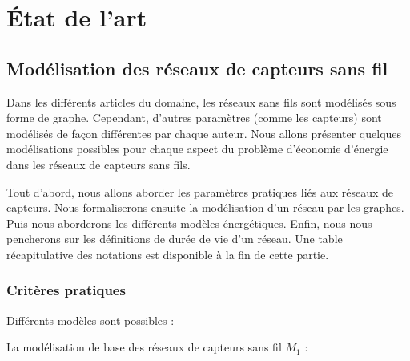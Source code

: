 
\chapter{État de l'art}\label{etat_art}

\section{Modélisation des réseaux de capteurs sans fil}


Dans les différents articles du domaine, les réseaux sans fils sont modélisés sous forme de graphe. Cependant, d'autres paramètres (comme les capteurs) sont modélisés de façon différentes par chaque auteur. Nous allons présenter quelques modélisations possibles pour chaque aspect du problème d'économie d'énergie dans les réseaux de capteurs sans fils.

Tout d'abord, nous allons aborder les paramètres pratiques liés aux réseaux de capteurs. Nous formaliserons ensuite la modélisation d'un réseau par les graphes. Puis nous aborderons les différents modèles énergétiques. Enfin, nous nous pencherons sur les définitions de durée de vie d'un réseau. Une table récapitulative des notations est disponible à la fin de cette partie.

\subsection{Critères pratiques}\label{modelePratique}


Différents modèles sont possibles :

La modélisation de base des réseaux de capteurs sans fil \textbf{$M_1$} \cite{Cartigny2003LMEB} :

